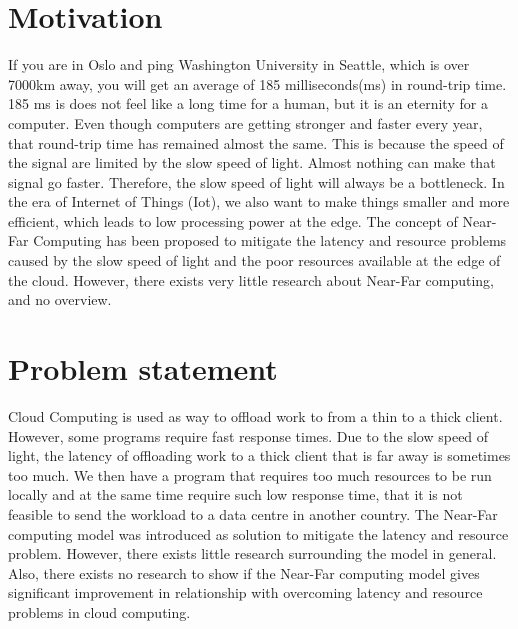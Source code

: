 

\section{Motivation}
If you are in Oslo and ping Washington University in Seattle, which is over 7000km away,  you will get an average of 185 milliseconds(ms) in round-trip time. 185 ms is does not feel like a long time for a human, but it is an eternity for a computer. Even though computers are getting stronger and faster every year, that round-trip time has remained almost the same. This is because the speed of the signal are limited by the slow speed of light. Almost nothing can make that signal go faster. Therefore, the slow speed of light will always be a bottleneck. In the era of Internet of Things (Iot), we also want to make things smaller and more efficient, which leads to low processing power at the edge. The concept of Near-Far Computing has been proposed to mitigate the latency and resource problems caused by the slow speed of light and the poor resources available at the edge of the cloud. However, there exists very little research about Near-Far computing, and no overview.



\section{Problem statement}         %
Cloud Computing is used as way to offload work to from a thin to a thick client. However, some programs require fast response times. Due to the slow speed of light, the latency of offloading work to a thick client that is far away is sometimes too much. We then have a program that requires too much resources to be run locally and at the same time require such low response time, that it is not feasible to send the workload to a data centre in another country. The Near-Far computing model was introduced as solution to mitigate the latency and resource problem. However, there exists little research surrounding the model in general. Also, there exists no research to show if the Near-Far computing model gives significant improvement in relationship with overcoming latency and resource problems in cloud computing.


